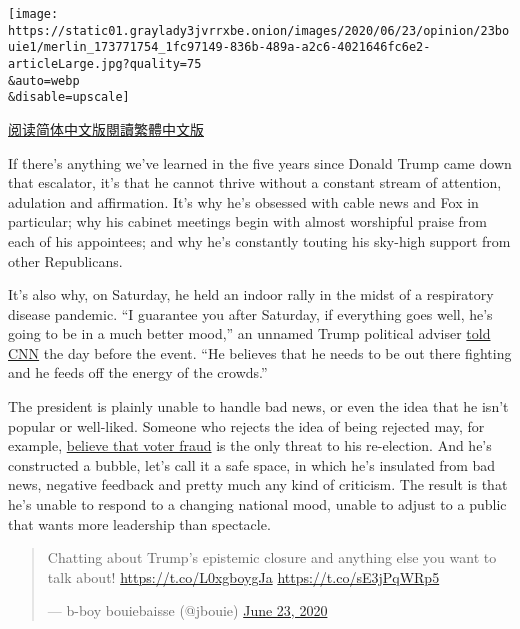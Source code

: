 \texttt{[image: https://static01.graylady3jvrrxbe.onion/images/2020/06/23/opinion/23bouie1/merlin\_173771754\_1fc97149-836b-489a-a2c6-4021646fc6e2-articleLarge.jpg?quality=75\\\&auto=webp\\\&disable=upscale]}

\href{https://cn.nytimes3xbfgragh.onion/opinion/20200624/maga-trump-fake-news/}{阅读简体中文版}\href{https://cn.nytimes3xbfgragh.onion/opinion/20200624/maga-trump-fake-news/zh-hant/}{閱讀繁體中文版}

If there's anything we've learned in the five years since Donald Trump
came down that escalator, it's that he cannot thrive without a constant
stream of attention, adulation and affirmation. It's why he's obsessed
with cable news and Fox in particular; why his cabinet meetings begin
with almost worshipful praise from each of his appointees; and why he's
constantly touting his sky-high support from other Republicans.

It's also why, on Saturday, he held an indoor rally in the midst of a
respiratory disease pandemic. ``I guarantee you after Saturday, if
everything goes well, he's going to be in a much better mood,'' an
unnamed Trump political adviser
\href{https://www.cnn.com/2020/06/19/politics/trump-turn-around-losing-campaign/index.html}{told
CNN} the day before the event. ``He believes that he needs to be out
there fighting and he feeds off the energy of the crowds.''

The president is plainly unable to handle bad news, or even the idea
that he isn't popular or well-liked. Someone who rejects the idea of
being rejected may, for example,
\href{https://twitter.com/realdonaldtrump/status/1275024974579982336?s=21}{believe
that voter fraud} is the only threat to his re-election. And he's
constructed a bubble, let's call it a safe space, in which he's
insulated from bad news, negative feedback and pretty much any kind of
criticism. The result is that he's unable to respond to a changing
national mood, unable to adjust to a public that wants more leadership
than spectacle.

\begin{quote}
Chatting about Trump's epistemic closure and anything else you want to
talk about! \href{https://t.co/L0xgboygJa}{https://t.co/L0xgboygJa}
\href{https://t.co/sE3jPqWRp5}{https://t.co/sE3jPqWRp5}

--- b-boy bouiebaisse (@jbouie)
\href{https://twitter.com/jbouie/status/1275477105204051969?ref_src=twsrc\%5Etfw}{June
23, 2020}
\end{quote}

